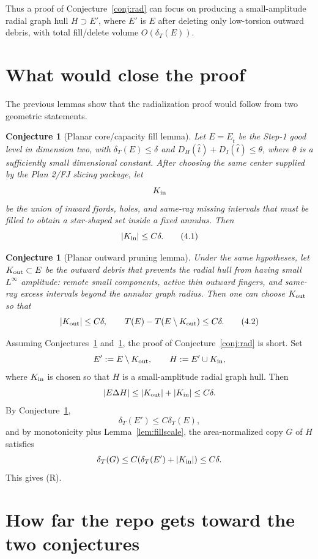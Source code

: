 \documentclass[11pt]{article}
\newtheorem{conjecture}[theorem]{Conjecture}
\newcommand{\dT}{\delta_T}
\begin{document}
Thus a proof of Conjecture~\ref{conj:rad} can focus on producing a
small-amplitude radial graph hull \(H\supset E'\), where \(E'\) is \(E\)
after deleting only low-torsion outward debris, with total fill/delete
volume \(O(\dT(E))\).

\section{What would close the proof}

The previous lemmas show that the radialization proof would follow from
two geometric statements.

\begin{conjecture}[Planar core/capacity fill lemma]
\label{conj:corefill}
Let \(E=E_{\hat t}\) be the Step-1 good level in dimension two, with
\(\dT(E)\le\delta\) and \(D_H(\hat t)+D_I(\hat t)\le\theta\), where
\(\theta\) is a sufficiently small dimensional constant.  After choosing
the same center supplied by the Plan 2/FJ slicing package, let
\[
   K_{\rm in}
\]
be the union of inward fjords, holes, and same-ray missing intervals
that must be filled to obtain a star-shaped set inside a fixed annulus.
Then
\[
   |K_{\rm in}|\le C\delta .
   \tag{4.1}
\]
\end{conjecture}

\begin{conjecture}[Planar outward pruning lemma]
\label{conj:outprune}
Under the same hypotheses, let \(K_{\rm out}\subset E\) be the outward
debris that prevents the radial hull from having small \(L^\infty\)
amplitude: remote small components, active thin outward fingers, and
same-ray excess intervals beyond the annular graph radius.  Then one
can choose \(K_{\rm out}\) so that
\[
   |K_{\rm out}|\le C\delta,
   \qquad
   T(E)-T(E\setminus K_{\rm out})\le C\delta .
   \tag{4.2}
\]
\end{conjecture}

Assuming Conjectures~\ref{conj:corefill} and~\ref{conj:outprune}, the
proof of Conjecture~\ref{conj:rad} is short.  Set
\[
   E':=E\setminus K_{\rm out},\qquad
   H:=E'\cup K_{\rm in},
\]
where \(K_{\rm in}\) is chosen so that \(H\) is a small-amplitude radial
graph hull.  Then
\[
   |E\Delta H|\le |K_{\rm out}|+|K_{\rm in}|\le C\delta .
\]
By Conjecture~\ref{conj:outprune},
\[
   \dT(E')\le C\dT(E),
\]
and by monotonicity plus Lemma~\ref{lem:fillscale}, the area-normalized
copy \(G\) of \(H\) satisfies
\[
   \dT(G)\le C(\dT(E')+|K_{\rm in}|)\le C\delta .
\]
This gives (R).

\section{How far the repo gets toward the two conjectures}
\end{document}
